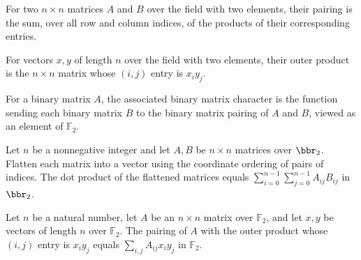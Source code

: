 \begin{definition}
\label{FABL.binaryMatrixPairing}
\leanok
{}
For two $n\times n$ matrices $A$ and $B$ over the field with two elements, their pairing
is the sum, over all row and column indices, of the products of their corresponding
entries.
\end{definition}

\begin{definition}
\label{FABL.binaryOuterProduct}
\leanok
{}
For vectors $x,y$ of length $n$ over the field with two elements, their outer product is
the $n\times n$ matrix whose $(i,j)$ entry is $x_i y_j$.
\end{definition}

\begin{definition}
\label{FABL.binaryMatrixCharacter}
\leanok
{}
For a binary matrix $A$, the associated binary matrix character is the function sending
each binary matrix $B$ to the binary matrix pairing of $A$ and $B$, viewed as an element
of $\mathbb{F}_2$.
\end{definition}

\begin{theorem}
\leanok
{}
Let $n$ be a nonnegative integer and let $A,B$ be $n\times n$ matrices over $\bbr_2$.
Flatten each matrix into a vector using the coordinate ordering of pairs of indices. The
dot product of the flattened matrices equals $\sum_{i=0}^{n-1}\sum_{j=0}^{n-1}
A_{ij}B_{ij}$ in $\bbr_2$.
\end{theorem}

\begin{theorem}
\label{FABL.binaryMatrixPairing_rankOne}
\leanok
{}
Let $n$ be a natural number, let $A$ be an $n\times n$ matrix over $\mathbb{F}_2$, and
let $x,y$ be vectors of length $n$ over $\mathbb{F}_2$. The pairing of $A$ with the
outer product whose $(i,j)$ entry is $x_i y_j$ equals $\sum_{i,j} A_{ij}x_i y_j$ in
$\mathbb{F}_2$.
\end{theorem}


